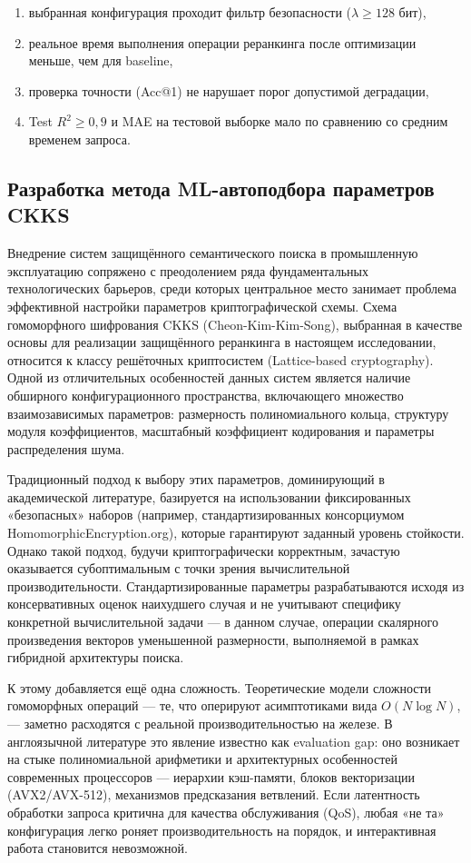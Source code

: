 \documentclass[a4paper, 12pt, oneside, openany]{article}
\begin{document}
\begin{enumerate} 
	\item выбранная конфигурация проходит фильтр безопасности ($\lambda \geq 128$ бит),
	 \item  реальное время выполнения операции реранкинга после оптимизации меньше, чем для baseline,
	  \item проверка точности (Acc@1) не нарушает порог допустимой деградации, 
	  \item Test $R^{2} \geq 0{,}9$ и MAE на тестовой выборке мало по сравнению со средним временем запроса.
\end{enumerate}

\subsection{Разработка метода ML-автоподбора параметров CKKS}

Внедрение систем защищённого семантического поиска в промышленную эксплуатацию сопряжено с преодолением ряда фундаментальных технологических барьеров, среди которых центральное место занимает проблема эффективной на\-строй\-ки па\-ра\-мет\-ров криптографической схемы. Схема гомоморфного шифрования CKKS (Cheon-Kim-Kim-Song), выбранная в качестве основы для реализации защищённого реранкинга в настоящем исследовании, относится к классу решёточных криптосистем (Lattice-based cryptography). Одной из отличительных особенностей данных систем является наличие обширного конфигурационного пространства, включающего множество взаимозависимых параметров: размерность полиномиального кольца, структуру модуля коэффициентов, масштабный коэффициент кодирования и параметры распределения шума.

Традиционный подход к выбору этих параметров, доминирующий в академической литературе, базируется на использовании фиксированных «безопасных» наборов (например, стандартизированных консорциумом HomomorphicEncryption.org), которые гарантируют заданный уровень стойкости. Однако такой подход, будучи криптографически корректным, зачастую оказывается субоптимальным с точки зрения вычислительной производительности. Стандартизированные параметры разрабатываются исходя из консервативных оценок наихудшего случая и не учитывают специфику конкретной вычислительной задачи --- в данном случае, операции скалярного произведения векторов уменьшенной размерности, выполняемой в рамках гибридной архитектуры поиска.

К этому добавляется ещё одна сложность. Теоретические модели сложности гомоморфных операций — те, что оперируют асимптотиками вида $O(N \log N)$, — заметно расходятся с реальной производительностью на железе. В англоязычной литературе это явление известно как evaluation gap: оно возникает на стыке полиномиальной арифметики и архитектурных особенностей современных процессоров — иерархии кэш-памяти, блоков векторизации (AVX2/AVX-512), механизмов предсказания ветвлений. Если латентность обработки запроса критична для качества обслуживания (QoS), любая «не та» конфигурация легко роняет производительность на порядок, и интерактивная работа становится невозможной.
\end{document}
